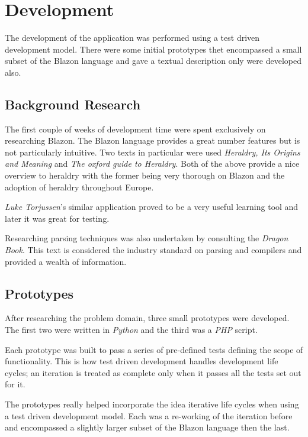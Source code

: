 \chapter{Development}

The development of the application was performed using a test driven development model.  There were some initial prototypes thet encompassed a small subset of the Blazon language and gave a textual description only were developed also. 


\section{Background Research}
The first couple of weeks of development time were spent exclusively on researching Blazon.  The Blazon language provides a great number features  but is not particularly intuitive.  Two texts in particular were used \emph{ Heraldry, Its Origins and Meaning}\cite{bob} and \emph{The oxford guide to Heraldry}\cite{oxford}.  Both of the above provide a nice overview to heraldry with the former being very thorough on Blazon and the adoption of heraldry throughout Europe. 

\emph{Luke Torjussen}'s similar application\cite{luke} proved to be a very useful learning tool and later it was great for testing.  

Researching parsing techniques was also undertaken by consulting the \emph{Dragon Book}\cite{dragon}.  This text is considered the industry standard on parsing and compilers and provided a wealth of information. 


\section{Prototypes}

After researching the problem domain, three small prototypes were developed.  The first two were written in \emph{Python} and the third was a \emph{PHP} script.  

Each prototype was built to pass a series of pre-defined tests defining the scope of functionality.  This is how test driven development handles development life cycles; an iteration is treated as complete only when it passes all the tests set out for it. 

The prototypes really helped incorporate the idea iterative life cycles when using a test driven development model.  Each was a re-working of the iteration before  and encompassed a slightly larger subset of the Blazon language then the last.

